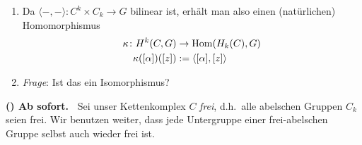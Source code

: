\begin{kommentar}
  \begin{enumerate}
    \item
      Da $\langle - ,- \rangle \colon C^k \times C_k \to G$ bilinear ist, erhält man also einen (natürlichen) Homomorphismus
      \begin{align*}
        \kappa \colon H^k(C,G) & \to \mathrm{Hom}(H_k(C),G) \\
        \kappa ([\alpha])([z]) & := \langle [\alpha],[z] \rangle
      \end{align*}
    \item
      \emph{Frage}: Ist das ein Isomorphismus?
  \end{enumerate}
\end{kommentar}
\textbf{(\theprop) Ab sofort.\ }
Sei unser Kettenkomplex $C$ \emph{frei}, d.h.\ alle abelschen Gruppen $C_k$ seien frei.
Wir benutzen weiter, dass jede Untergruppe einer frei-abelschen Gruppe selbst auch wieder frei ist.
